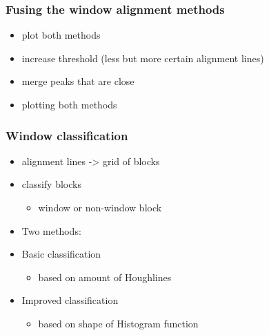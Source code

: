 \documentclass{beamer}
\begin{document}
\frame
{
}




\frame
{
	\frametitle{Fusing the window alignment methods}
	\begin{itemize}
	\item <+-| alert@+> plot both methods
	\item <+-| alert@+> increase threshold (less but more certain alignment lines)
	\item <+-| alert@+> merge peaks that are close
	\item <+-| alert@+> plotting both methods
	\end{itemize}
}

\frame
{
}


\frame
{
}

\frame
{
}

\frame
{
}

\frame
{
}


\frame
{
	\frametitle{Window classification}
	\begin{itemize}
	\item <+-| alert@+> alignment lines -> grid of blocks
	\item <+-| alert@+> classify blocks 
		\begin{itemize}
		\item <+-| alert@+> window or non-window block
		\end{itemize}
	\item <+-| alert@+> Two methods:
	\item <+-| alert@+> Basic classification 
		\begin{itemize}
		\item <+-| alert@+> based on amount of Houghlines
		\end{itemize}
	\item <+-| alert@+> Improved classification 
		\begin{itemize}
		\item <+-| alert@+> based on shape of Histogram function
		\end{itemize}
	\end{itemize}
}
\end{document}
